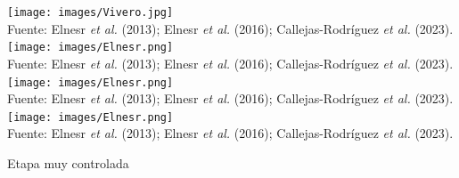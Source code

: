 \documentclass[aspectratio=169]{beamer}
\begin{document}
\begin{frame}
\begin{minipage}{0.5\textwidth}
        \begin{overprint}
\centering\texttt{[image: images/Vivero.jpg]}\\\hfill {\scriptsize Fuente: Elnesr \textit{et al.} (2013); Elnesr \textit{et al.} (2016); Callejas-Rodríguez \textit{et al.} (2023).}
  \centering\vspace{1cm}\texttt{[image: images/Elnesr.png]}\\\hfill {\scriptsize Fuente: Elnesr \textit{et al.} (2013); Elnesr \textit{et al.} (2016); Callejas-Rodríguez \textit{et al.} (2023).}
  \centering\vspace{1cm}\texttt{[image: images/Elnesr.png]}\\\hfill {\scriptsize Fuente: Elnesr \textit{et al.} (2013); Elnesr \textit{et al.} (2016); Callejas-Rodríguez \textit{et al.} (2023).}
  \centering\vspace{1cm}\texttt{[image: images/Elnesr.png]}\\\hfill {\scriptsize Fuente: Elnesr \textit{et al.} (2013); Elnesr \textit{et al.} (2016); Callejas-Rodríguez \textit{et al.} (2023).}
        \end{overprint}
		\end{minipage}
        \pause
        \begin{minipage}{0.5\textwidth}
            \pause\vspace{-12.5cm}\begin{block}{\centering Etapa muy controlada}
            \end{block}
        \end{minipage}
\end{frame}
\end{document}
